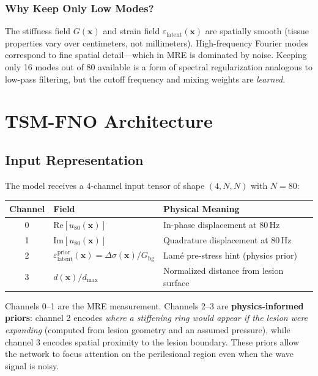 \documentclass[11pt,letterpaper]{article}
\newcommand{\xvec}{\bm{x}}
\newcommand{\Gbg}{G_{\mathrm{bg}}}
\newcommand{\eps}{\varepsilon_{\mathrm{latent}}}
\newcommand{\Dsig}{\Delta\sigma}
\begin{document}
\subsubsection{Why Keep Only Low Modes?}

The stiffness field $G(\xvec)$ and strain field $\eps(\xvec)$ are spatially smooth
(tissue properties vary over centimeters, not millimeters). High-frequency Fourier modes
correspond to fine spatial detail---which in MRE is dominated by noise. Keeping only
16 modes out of 80 available is a form of spectral regularization analogous to
low-pass filtering, but the cutoff frequency and mixing weights are \emph{learned}.

\section{TSM-FNO Architecture}

\subsection{Input Representation}

The model receives a 4-channel input tensor of shape $(4, N, N)$ with $N = 80$:

\begin{center}
\renewcommand{\arraystretch}{1.3}
\begin{tabular}{cll}
\toprule
Channel & Field & Physical Meaning \\
\midrule
0 & $\mathrm{Re}[u_{80}(\xvec)]$ & In-phase displacement at 80\,Hz \\
1 & $\mathrm{Im}[u_{80}(\xvec)]$ & Quadrature displacement at 80\,Hz \\
2 & $\eps^{\mathrm{prior}}(\xvec) = \Dsig(\xvec)/\Gbg$ & Lam\'{e} pre-stress hint (physics prior) \\
3 & $d(\xvec)/d_{\max}$ & Normalized distance from lesion surface \\
\bottomrule
\end{tabular}
\end{center}

Channels 0--1 are the MRE measurement. Channels 2--3 are \textbf{physics-informed
priors}: channel 2 encodes \emph{where a stiffening ring would appear if the lesion
were expanding} (computed from lesion geometry and an assumed pressure), while channel 3
encodes spatial proximity to the lesion boundary. These priors allow the network to focus
attention on the perilesional region even when the wave signal is noisy.
\end{document}
